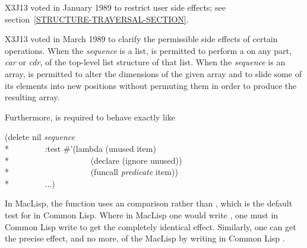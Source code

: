\begin{defun}[Function]
\begin{new}
X3J13 voted in January 1989
to restrict user side effects; see section~\ref{STRUCTURE-TRAVERSAL-SECTION}.
\end{new}

\begin{newer}
X3J13 voted in March 1989 
to clarify the permissible side effects of certain operations.
When the {\it sequence} is a list,
 is permitted to perform a  on any part,
{\it car} or {\it cdr}, of the top-level list structure of that list.
When the {\it sequence} is an array,
 is permitted to alter the dimensions of the given array
and to slide some of its elements into new positions without permuting them
in order to produce the resulting array.

Furthermore, 
is required to behave exactly like
\begin{lisp}
(delete nil {\it sequence} \\*
~~~~~~~~:test \#'(lambda (unused item) \\*
~~~~~~~~~~~~~~~~~~~(declare (ignore unused)) \\*
~~~~~~~~~~~~~~~~~~~(funcall {\it predicate} item)) \\*
~~~~~~~~...)
\end{lisp}
\end{newer}

\beforenoterule
\begin{incompatibility}
In MacLisp, the  function uses
an  comparison rather than , which is the default
test for  in Common Lisp.  Where in MacLisp one would write
, one must in Common Lisp write 
to get the completely identical effect.  Similarly, one can get the
precise effect, and no more, of the MacLisp 
by writing in Common Lisp .
\end{incompatibility}
\afternoterule
\end{defun}

